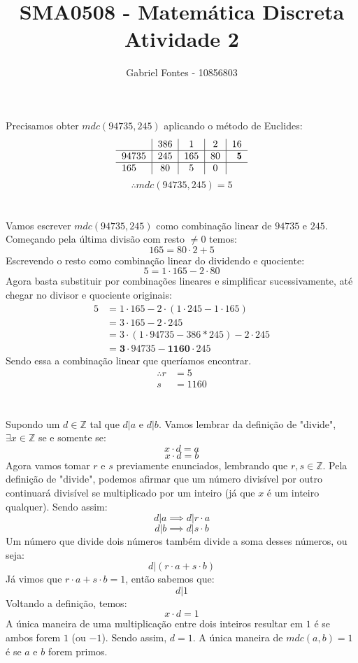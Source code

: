 \documentclass{article}
\title{SMA0508 - Matemática Discreta \\ Atividade 2}
\author{Gabriel Fontes - 10856803}
\newcommand{\bftab}{\fontseries{b}\selectfont}
\begin{document}
\maketitle

\section{}
Precisamos obter $mdc(94735, 245)$ aplicando o método de Euclides:
$$\begin{tabular}{ l | c | c | c | r}
        & 386 & 1   & 2  & 16        \\
  \hline
  94735 & 245 & 165 & 80 & \bftab 5  \\
  \hline
  165   & 80  & 5   & 0  &           \\
\end{tabular}$$
$$\therefore mdc(94735, 245) = 5$$

\section{}
Vamos escrever $mdc(94735, 245)$ como combinação linear de $94735$ e $245$. \\
Começando pela última divisão com resto $\ne 0$ temos:
$$165 = 80 \cdot 2 + 5$$
Escrevendo o resto como combinação linear do dividendo e quociente:
$$5 = 1 \cdot 165 - 2 \cdot 80$$
Agora basta substituir por combinações lineares e simplificar sucessivamente, até chegar no divisor e quociente originais:
\begin{align*}
5 &= 1 \cdot 165 - 2 \cdot (1 \cdot 245 - 1 \cdot 165)   \\
  &= 3 \cdot 165 - 2 \cdot 245                       \\
  &= 3 \cdot (1 \cdot 94735 - 386*245) - 2 \cdot 245   \\
  &= \mathbf{3} \cdot 94735 -\mathbf{1160} \cdot 245
\end{align*}
Sendo essa a combinação linear que queríamos encontrar.
\begin{align*}
\therefore r &= 5 \\
s &= 1160
\end{align*}

\section{}
Supondo um $d \in \mathbb{Z}$ tal que $ d|a$ e $d|b$. Vamos lembrar da definição de "divide", $\exists x \in \mathbb{Z}$ se e somente se:
$$x \cdot d = a$$
$$x \cdot d = b$$
Agora vamos tomar $r$ e $s$ previamente enunciados, lembrando que $r, s \in \mathbb{Z}$. Pela definição de "divide", podemos afirmar que um número divisível por outro continuará divisível se multiplicado por um inteiro (já que $x$ é um inteiro qualquer). Sendo assim:
$$d|a \implies d | r \cdot a$$
$$d|b \implies d | s \cdot b$$
Um número que divide dois números também divide a soma desses números, ou seja:
$$d |(r \cdot a + s \cdot b)$$
Já vimos que $r \cdot a + s \cdot b = 1$, então sabemos que:
$$d|1$$
Voltando a definição, temos:
$$x \cdot d = 1$$
A única maneira de uma multiplicação entre dois inteiros resultar em $1$ é se ambos forem $1$ (ou $-1$).
Sendo assim, $d = 1$. A única maneira de $mdc(a,b) = 1$ é se $a$ e $b$ forem primos.

\section{}
\end{document}
